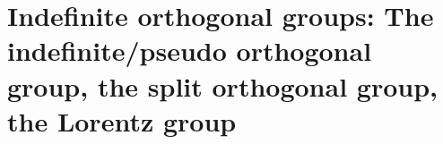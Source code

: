 
\chapter{Indefinite orthogonal groups: The indefinite/pseudo orthogonal group, the split orthogonal group, the Lorentz group}

